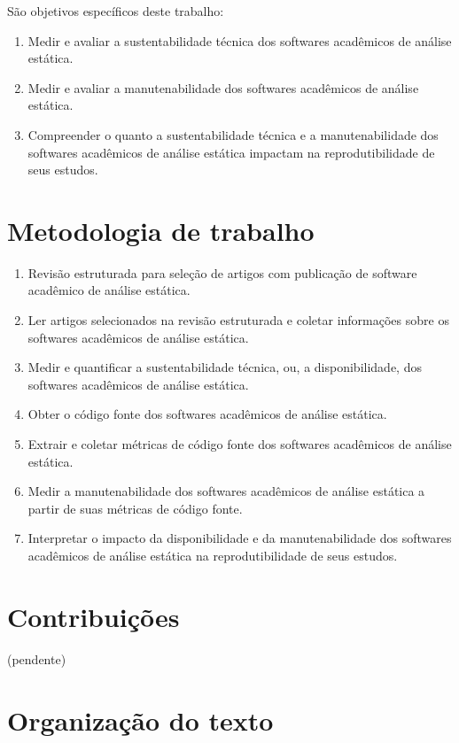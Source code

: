 São objetivos específicos deste trabalho:

\begin{enumerate}
  \item Medir e avaliar a sustentabilidade técnica dos softwares acadêmicos de
        análise estática.
  \item Medir e avaliar a manutenabilidade dos softwares acadêmicos de análise
        estática.
  \item Compreender o quanto a sustentabilidade técnica e a manutenabilidade
        dos softwares acadêmicos de análise estática impactam na
        reprodutibilidade de seus estudos.
\end{enumerate}

\section{Metodologia de trabalho}

\begin{enumerate}
  \item Revisão estruturada para seleção de artigos com publicação de software
        acadêmico de análise estática.
  \item Ler artigos selecionados na revisão estruturada e coletar informações sobre
        os softwares acadêmicos de análise estática.
  \item Medir e quantificar a sustentabilidade técnica, ou, a disponibilidade, dos
        softwares acadêmicos de análise estática.
  \item Obter o código fonte dos softwares acadêmicos de análise estática.
  \item Extrair e coletar métricas de código fonte dos softwares acadêmicos de
        análise estática.
  \item Medir a manutenabilidade dos softwares acadêmicos de análise estática
        a partir de suas métricas de código fonte.
  \item Interpretar o impacto da disponibilidade e da manutenabilidade dos softwares
        acadêmicos de análise estática na reprodutibilidade de seus estudos.
\end{enumerate}

\section{Contribuições}

(pendente)

\section{Organização do texto}

